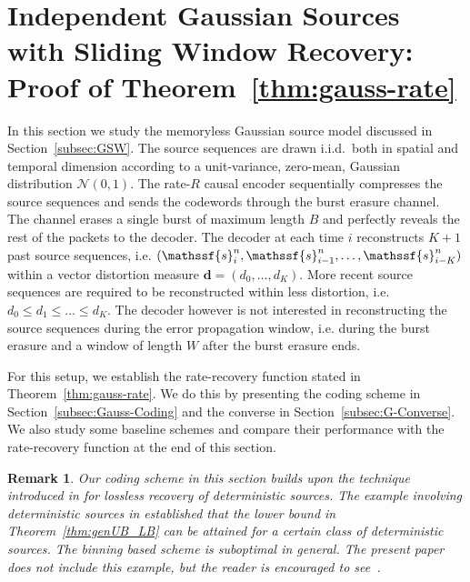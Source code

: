 \documentclass[journal, twocolumn, 10pt]{IEEEtran}
\newtheorem{remark}{Remark}
\newcommand{\bd}{{\mathbf{d}}}
\newcommand{\rvs}{{\mathssf{s}}}    %
\begin{document}
{\section{Independent Gaussian Sources with Sliding Window Recovery: Proof of Theorem~\ref{thm:gauss-rate}}
\label{sec:Gauss}
In this section we study the memoryless Gaussian source model discussed in Section~\ref{subsec:GSW}.
The source sequences are drawn i.i.d.\ both in spatial and temporal dimension according to a unit-variance, zero-mean, Gaussian distribution $\mathcal{N}(0,1)$. The rate-$R$ causal encoder sequentially compresses the source sequences and sends the codewords through the burst erasure channel. The channel erases a single burst of maximum length  $B$ and  perfectly reveals the rest of the packets to the decoder. The decoder at each time $i$ reconstructs $K+1$ past source sequences, i.e. $(\rvs^n_{i}, \rvs^n_{i-1}, \ldots, \rvs^n_{i-K})$ within a vector distortion measure $\bd = (d_0, \ldots, d_{K})$. More recent source sequences are required to be reconstructed within less distortion, i.e.  $d_0 \le d_1\le \ldots\le  d_{K}$. The decoder however is not interested in reconstructing the source sequences during the error propagation window, i.e. during the burst erasure and a window of length $W$ after the burst erasure ends. 

For this setup, we establish the rate-recovery function stated in Theorem~\ref{thm:gauss-rate}. We do this by presenting the coding scheme in Section~\ref{subsec:Gauss-Coding} and the converse in Section~\ref{subsec:G-Converse}. We also study some baseline schemes and compare their performance with the rate-recovery function at the end of this section.  

\begin{remark}
Our coding scheme in this section builds upon the technique introduced in \cite{etezadiKhistiDCC:12} for lossless recovery of deterministic sources. The example involving deterministic sources in  \cite{etezadiKhistiDCC:12} established that the lower bound in Theorem~\ref{thm:genUB_LB} can be attained for a certain class of deterministic sources. The binning based scheme is  suboptimal in general. The present paper does not include this example, but the reader is encouraged to see~\cite{etezadiKhistiDCC:12}.
\end{remark}

}
\end{document}

